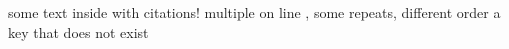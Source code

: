 \documentclass{article}
\begin{document}
some text inside \cite{kor2018} with citations!
multiple on line \cite{fra2021}, \cite{frpreprint}
some repeats, different order \cite{fra2021, lr2015}
a key that does not exist \cite{noexist}
\printbibliography
\end{document}
